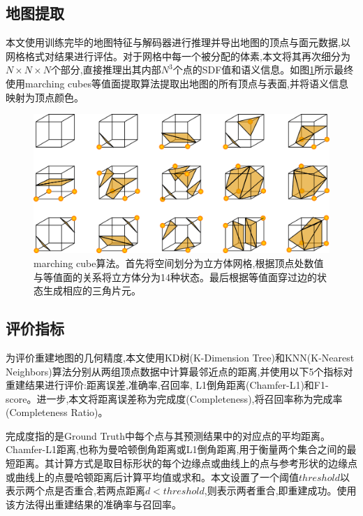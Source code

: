 \subsection{地图提取}
本文使用训练完毕的地图特征与解码器进行推理并导出地图的顶点与面元数据,以网格格式对结果进行评估。对于网格中每一个被分配的体素,本文将其再次细分为$N \times N \times N$个部分,直接推理出其内部$N^3$个点的SDF值和语义信息。如图\ref{marching}所示最终使用marching cubes\cite{marchingcubes}等值面提取算法提取出地图的所有顶点与表面,并将语义信息映射为顶点颜色。
\begin{figure}[htbp]
    \centering
    \includegraphics[scale=0.7]{figures/MarchingCubes.png}
    \caption{marching cube算法\cite{marchingpicture}。首先将空间划分为立方体网格,根据顶点处数值与等值面的关系将立方体分为14种状态。最后根据等值面穿过边的状态生成相应的三角片元。}\label{marching}
\end{figure}
\subsection{评价指标}\label{metric}
为评价重建地图的几何精度,本文使用KD树\cite{kd}(K-Dimension Tree)和KNN\cite{knn}(K-Nearest Neighbors)算法分别从两组顶点数据中计算最邻近点的距离,并使用以下5个指标对重建结果进行评价:距离误差,准确率,召回率, L1倒角距离(Chamfer-L1)和F1-score。进一步,本文将距离误差称为完成度(Completeness),将召回率称为完成率(Completeness Ratio)。

完成度指的是Ground Truth中每个点与其预测结果中的对应点的平均距离。Chamfer-L1距离,也称为曼哈顿倒角距离或L1倒角距离,用于衡量两个集合之间的最短距离。其计算方式是取目标形状的每个边缘点或曲线上的点与参考形状的边缘点或曲线上的点曼哈顿距离后计算平均值或求和。本文设置了一个阈值$threshold$以表示两个点是否重合,若两点距离$d<threshold$,则表示两者重合,即重建成功。使用该方法得出重建结果的准确率与召回率。

